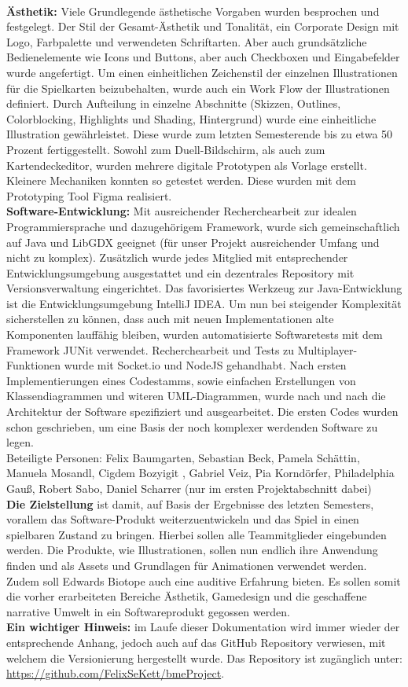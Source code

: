\\
\textbf{Ästhetik:}
Viele Grundlegende ästhetische Vorgaben wurden besprochen und festgelegt. Der Stil der Gesamt-Ästhetik und Tonalität, ein Corporate Design mit Logo, Farbpalette und verwendeten Schriftarten.
Aber auch grundsätzliche Bedienelemente wie Icons und Buttons, aber auch Checkboxen und Eingabefelder wurde angefertigt. Um einen einheitlichen Zeichenstil der einzelnen Illustrationen für die Spielkarten beizubehalten, wurde auch ein Work Flow der Illustrationen definiert. Durch Aufteilung in einzelne Abschnitte (Skizzen, Outlines, Colorblocking, Highlights und Shading, Hintergrund) wurde eine einheitliche Illustration gewährleistet. Diese wurde zum letzten Semesterende bis zu etwa 50 Prozent fertiggestellt. Sowohl zum Duell-Bildschirm, als auch zum Kartendeckeditor, wurden mehrere digitale Prototypen als Vorlage erstellt. Kleinere Mechaniken konnten so getestet werden. Diese wurden mit dem Prototyping Tool Figma realisiert. \\
\textbf{Software-Entwicklung:}
Mit ausreichender Recherchearbeit zur idealen Programmiersprache und dazugehörigem Framework, wurde sich gemeinschaftlich auf Java und LibGDX geeignet (für unser Projekt ausreichender Umfang und nicht zu komplex). Zusätzlich wurde jedes Mitglied mit entsprechender Entwicklungsumgebung ausgestattet und ein dezentrales Repository mit Versionsverwaltung eingerichtet. Das favorisiertes Werkzeug zur Java-Entwicklung ist die Entwicklungsumgebung IntelliJ IDEA.
Um nun bei steigender Komplexität sicherstellen zu können, dass auch mit neuen Implementationen alte Komponenten lauffähig bleiben, wurden automatisierte Softwaretests mit dem Framework JUNit verwendet. Recherchearbeit und Tests zu Multiplayer-Funktionen wurde mit Socket.io und NodeJS gehandhabt. Nach ersten Implementierungen eines Codestamms, sowie einfachen Erstellungen von Klassendiagrammen und witeren UML-Diagrammen, wurde nach und nach die Architektur der Software spezifiziert und ausgearbeitet. Die ersten Codes wurden schon geschrieben, um eine Basis der noch komplexer werdenden Software zu legen.\\

Beteiligte Personen: Felix Baumgarten, Sebastian Beck, Pamela Schättin, Manuela Mosandl, Cigdem Bozyigit , Gabriel Veiz, Pia Korndörfer, Philadelphia Gauß, Robert Sabo, Daniel Scharrer (nur im ersten Projektabschnitt dabei)\\

\textbf{Die Zielstellung} ist damit, auf Basis der Ergebnisse des letzten Semesters, vorallem das Software-Produkt weiterzuentwickeln und das Spiel in einen spielbaren Zustand zu bringen. Hierbei sollen alle Teammitglieder eingebunden werden. Die Produkte, wie Illustrationen, sollen nun endlich ihre Anwendung finden und als Assets und Grundlagen für Animationen verwendet werden. Zudem soll Edwards Biotope auch eine auditive Erfahrung bieten. Es sollen somit die vorher erarbeiteten Bereiche Ästhetik, Gamedesign und die geschaffene narrative Umwelt in ein Softwareprodukt gegossen werden.\\

\textbf{Ein wichtiger Hinweis:} im Laufe dieser Dokumentation wird immer wieder der entsprechende Anhang, jedoch auch auf das GitHub Repository verwiesen, mit welchem die Versionierung hergestellt wurde. Das Repository ist zugänglich unter: \url{https://github.com/FelixSeKett/bmeProject}.